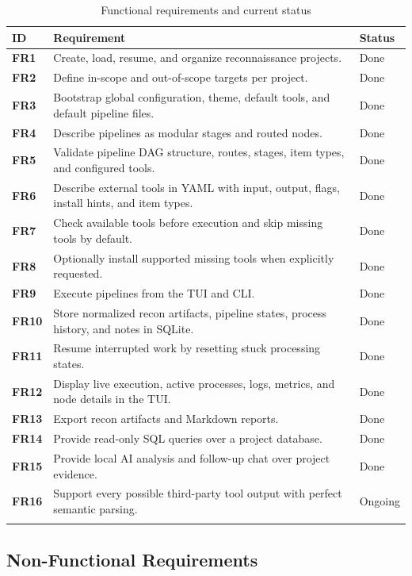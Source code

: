 \documentclass[a4paper,12pt]{article}
\begin{document}
\begin{longtable}{>{\bfseries}p{2.2cm}p{10.2cm}p{2.2cm}}
    \toprule
    ID & Requirement & Status \\
    \midrule
    FR1 & Create, load, resume, and organize reconnaissance projects. & Done \\
    FR2 & Define in-scope and out-of-scope targets per project. & Done \\
    FR3 & Bootstrap global configuration, theme, default tools, and default pipeline files. & Done \\
    FR4 & Describe pipelines as modular stages and routed nodes. & Done \\
    FR5 & Validate pipeline DAG structure, routes, stages, item types, and configured tools. & Done \\
    FR6 & Describe external tools in YAML with input, output, flags, install hints, and item types. & Done \\
    FR7 & Check available tools before execution and skip missing tools by default. & Done \\
    FR8 & Optionally install supported missing tools when explicitly requested. & Done \\
    FR9 & Execute pipelines from the TUI and CLI. & Done \\
    FR10 & Store normalized recon artifacts, pipeline states, process history, and notes in SQLite. & Done \\
    FR11 & Resume interrupted work by resetting stuck processing states. & Done \\
    FR12 & Display live execution, active processes, logs, metrics, and node details in the TUI. & Done \\
    FR13 & Export recon artifacts and Markdown reports. & Done \\
    FR14 & Provide read-only SQL queries over a project database. & Done \\
    FR15 & Provide local AI analysis and follow-up chat over project evidence. & Done \\
    FR16 & Support every possible third-party tool output with perfect semantic parsing. & Ongoing \\
    \bottomrule
    \caption{Functional requirements and current status}
    \label{tab:functional-requirements}
\end{longtable}

\subsection{Non-Functional Requirements}
\end{document}
